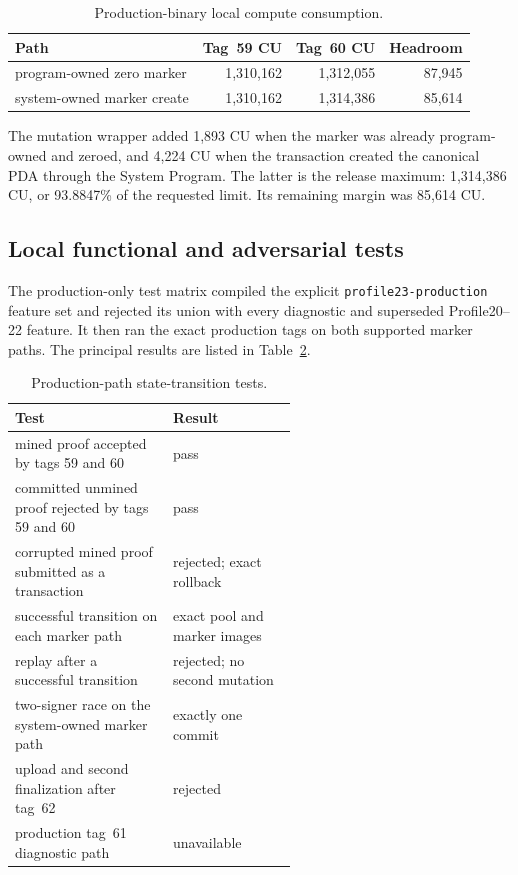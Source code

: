 \begin{table}[t]
  \centering
  \small
  \caption{Production-binary local compute consumption.}
  \label{tab:production-cu}
  \begin{tabular}{l r r r}
    \toprule
    Path & Tag~59 CU & Tag~60 CU & Headroom \\
    \midrule
    program-owned zero marker & 1,310,162 & 1,312,055 & 87,945 \\
    system-owned marker create & 1,310,162 & 1,314,386 & 85,614 \\
    \bottomrule
  \end{tabular}
\end{table}

The mutation wrapper added 1,893 CU when the marker was already
program-owned and zeroed, and 4,224 CU when the transaction created the
canonical PDA through the System Program.  The latter is the release maximum:
1,314,386 CU, or 93.8847\% of the requested limit.  Its remaining margin was
85,614 CU\@.

\subsection{Local functional and adversarial tests}
\label{sec:evaluation-local-tests}

The production-only test matrix compiled the explicit
\texttt{profile23-production} feature set and rejected its union with every
diagnostic and superseded Profile20--22 feature.  It then ran the exact
production tags on both supported marker paths.  The principal results are
listed in Table~\ref{tab:production-tests}.

\begin{table}[t]
  \centering
  \small
  \caption{Production-path state-transition tests.}
  \label{tab:production-tests}
  \begin{tabular}{p{0.56\linewidth} l}
    \toprule
    Test & Result \\
    \midrule
    mined proof accepted by tags 59 and 60 & pass \\
    committed unmined proof rejected by tags 59 and 60 & pass \\
    corrupted mined proof submitted as a transaction & rejected; exact rollback \\
    successful transition on each marker path & exact pool and marker images \\
    replay after a successful transition & rejected; no second mutation \\
    two-signer race on the system-owned marker path & exactly one commit \\
    upload and second finalization after tag~62 & rejected \\
    production tag~61 diagnostic path & unavailable \\
    \bottomrule
  \end{tabular}
\end{table}

